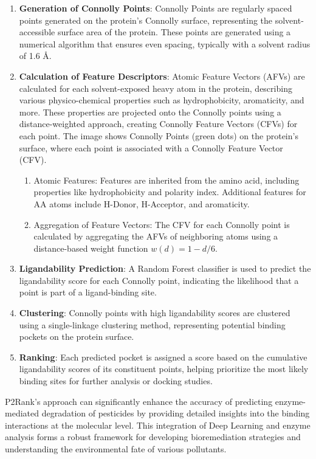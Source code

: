 \begin{enumerate} 
    \item \textbf{Generation of Connolly Points}: Connolly Points are regularly spaced points generated on the protein’s Connolly surface, representing the solvent-accessible surface area of the protein. These points are generated using a numerical algorithm that ensures even spacing, typically with a solvent radius of 1.6 Å.
    \item \textbf{Calculation of Feature Descriptors}: Atomic Feature Vectors (AFVs) are calculated for each solvent-exposed heavy atom in the protein, describing various physico-chemical properties such as hydrophobicity, aromaticity, and more. These properties are projected onto the Connolly points using a distance-weighted approach, creating Connolly Feature Vectors (CFVs) for each point. The image shows Connolly Points (green dots) on the protein’s surface, where each point is associated with a Connolly Feature Vector (CFV).
    \begin{enumerate}
        \item Atomic Features: Features are inherited from the amino acid, including properties like hydrophobicity and polarity index. Additional features for AA atoms include H-Donor, H-Acceptor, and aromaticity.
        \item Aggregation of Feature Vectors: The CFV for each Connolly point is calculated by aggregating the AFVs of neighboring atoms using a distance-based weight function $w(d) = 1 - d / 6$.
    \end{enumerate}
    \item \textbf{Ligandability Prediction}: A Random Forest classifier is used to predict the ligandability score for each Connolly point, indicating the likelihood that a point is part of a ligand-binding site.
    \item \textbf{Clustering}: Connolly points with high ligandability scores are clustered using a single-linkage clustering method, representing potential binding pockets on the protein surface.
    \item \textbf{Ranking}: Each predicted pocket is assigned a score based on the cumulative ligandability scores of its constituent points, helping prioritize the most likely binding sites for further analysis or docking studies.
\end{enumerate}

P2Rank's approach can significantly enhance the accuracy of predicting enzyme-mediated degradation of pesticides by providing detailed insights into the binding interactions at the molecular level. This integration of Deep Learning and enzyme analysis forms a robust framework for developing bioremediation strategies and understanding the environmental fate of various pollutants. \autocite{krivakP2RankMachineLearning2018}

